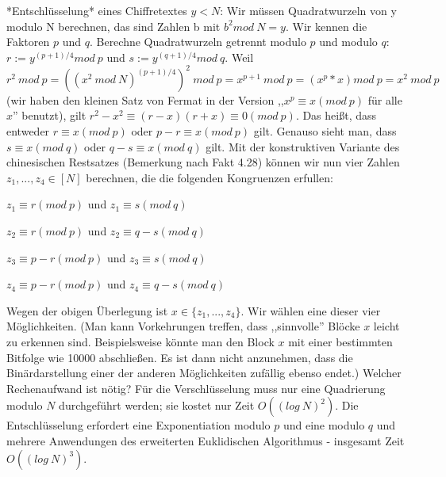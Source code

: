 \documentclass[a4paper]{article}
\begin{document}
\begin{multicols}{3}
        *Entschlüsselung* eines Chiffretextes $y<N$: Wir müssen Quadratwurzeln von y modulo N berechnen, das sind Zahlen b mit $b^2 mod\ N=y$. Wir kennen die Faktoren $p$ und $q$. Berechne Quadratwurzeln getrennt modulo $p$ und modulo $q$: $r:=y^{(p+1)/4} mod\ p$ und $s:=y^{(q+1)/4} mod\ q$.
        Weil $r^2\ mod\ p =((x^2\ mod\ N)^{(p+1)/4})^2\ mod\ p=x^{p+1}\ mod\ p=(x^p *x) mod\ p = x^2\ mod\ p$ (wir haben den kleinen Satz von Fermat in der Version ,,$x^p\equiv x(mod\ p)$ für alle $x$'' benutzt), gilt $r^2-x^2\equiv (r-x)(r+x)\equiv 0 (mod\ p)$. Das heißt, dass entweder $r\equiv x(mod\ p)$ oder $p-r\equiv x(mod\ p)$ gilt.
        Genauso sieht man, dass $s\equiv x(mod\ q)$ oder $q-s\equiv x(mod\ q)$ gilt.
        Mit der konstruktiven Variante des chinesischen Restsatzes (Bemerkung nach Fakt 4.28) können wir nun vier Zahlen $z_1,...,z_4 \in [N]$ berechnen, die die folgenden Kongruenzen erfullen:
        \begin{itemize*}
            \item  $z_1 \equiv r (mod\ p)$ und $z_1 \equiv s (mod\ q)$
            \item  $z_2 \equiv r (mod\ p)$ und $z_2 \equiv q-s (mod\ q)$
            \item  $z_3 \equiv p-r (mod\ p)$ und $z_3 \equiv s (mod\ q)$
            \item  $z_4 \equiv p-r (mod\ p)$ und $z_4 \equiv q-s (mod\ q)$
        \end{itemize*}

        Wegen der obigen Überlegung ist $x\in\{z_1,...,z_4\}$. Wir wählen eine dieser vier Möglichkeiten. (Man kann Vorkehrungen treffen, dass ,,sinnvolle'' Blöcke $x$ leicht zu erkennen sind. Beispielsweise könnte man den Block $x$ mit einer bestimmten Bitfolge wie 10000 abschließen. Es ist dann nicht anzunehmen, dass die Binärdarstellung einer der anderen Möglichkeiten zufällig ebenso endet.)
        Welcher Rechenaufwand ist nötig? Für die Verschlüsselung muss nur eine Quadrierung modulo $N$ durchgeführt werden; sie kostet nur Zeit $O((log\ N)^2)$. Die Entschlüsselung erfordert eine Exponentiation modulo $p$ und eine modulo $q$ und mehrere Anwendungen des erweiterten Euklidischen Algorithmus - insgesamt Zeit $O((log\ N)^3)$.


\end{multicols}
\end{document}
